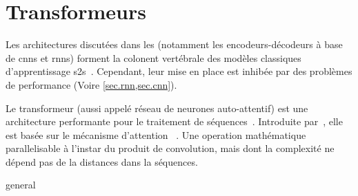 \section{Transformeurs}

Les architectures discutées dans les 
(notamment les encodeurs-décodeurs à base de \glspl{cnn} et \glspl{rnn}) 
forment la colonent vertébrale des modèles classiques d'apprentissage \gls{s2s}~\cite{deep-nmt-survey}.
Cependant, leur mise en place est inhibée par des problèmes de performance 
(Voire \cref{sec.rnn,sec.cnn}).

Le transformeur (aussi appelé réseau de neurones auto-attentif) est une architecture performante pour le traitement de séquences~\cite{Shim_Sung_2022}.
Introduite par~\cite{attention}, elle est basée sur le mécanisme d'attention%
~\cite{Bahdanau_Cho_Bengio_2016}.
Une operation mathématique parallelisable à l'instar du produit de convolution, 
mais dont la complexité ne dépend pas de la distances dans la séquences.



{general}